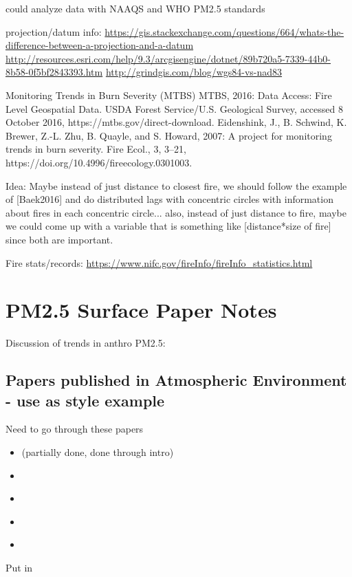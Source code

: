 could analyze data with NAAQS and WHO PM2.5 standards

projection/datum info: \url{https://gis.stackexchange.com/questions/664/whats-the-difference-between-a-projection-and-a-datum}
\url{http://resources.esri.com/help/9.3/arcgisengine/dotnet/89b720a5-7339-44b0-8b58-0f5bf2843393.htm}
\url{http://grindgis.com/blog/wgs84-vs-nad83}

Monitoring Trends in Burn Severity (MTBS) MTBS, 2016: Data Access: Fire Level Geospatial Data. USDA Forest Service/U.S. Geological Survey, accessed 8 October 2016, https://mtbs.gov/direct-download. 
Eidenshink, J., B. Schwind, K. Brewer, Z.-L. Zhu, B. Quayle, and S. Howard, 2007: A project for monitoring trends in burn severity. Fire Ecol., 3, 3–21, https://doi.org/10.4996/fireecology.0301003. 

Idea: Maybe instead of just distance to closest fire, we should follow the example of [Baek2016] and do distributed lags with concentric circles with information about fires in each concentric circle... also, instead of just distance to fire, maybe we could come up with a variable that is something like [distance*size of fire] since both are important.

Fire stats/records: \url{https://www.nifc.gov/fireInfo/fireInfo_statistics.html}

\section{PM2.5 Surface Paper Notes}

Discussion of trends in anthro PM2.5: \cite{ridley_causes_2018}

\subsection{Papers published in Atmospheric Environment - use as style example}

Need to go through these papers
\begin{itemize}
\item \cite{BrokampExposure2017} (partially done, done through intro)
\item \cite{Sampson2013}
\item \cite{Anyenda2016}
\item \cite{Torvela2014}
\item \cite{Whiteman2014}
\end{itemize}

Put in \cite{BrokampExposure2017,larsen_impacts_2017}

